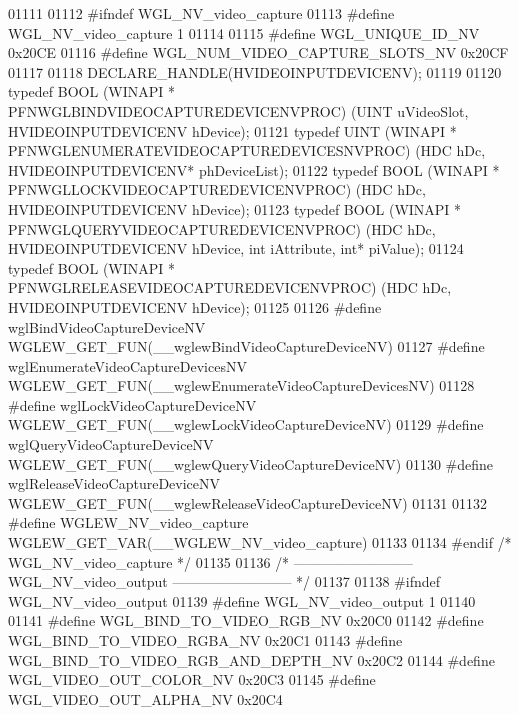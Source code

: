 \begin{DoxyCode}
01111 
01112 \textcolor{preprocessor}{#ifndef WGL\_NV\_video\_capture}
01113 \textcolor{preprocessor}{#define WGL\_NV\_video\_capture 1}
01114 
01115 \textcolor{preprocessor}{#define WGL\_UNIQUE\_ID\_NV 0x20CE}
01116 \textcolor{preprocessor}{#define WGL\_NUM\_VIDEO\_CAPTURE\_SLOTS\_NV 0x20CF}
01117 
01118 DECLARE_HANDLE(HVIDEOINPUTDEVICENV);
01119 
01120 \textcolor{keyword}{typedef} BOOL (WINAPI * PFNWGLBINDVIDEOCAPTUREDEVICENVPROC) (UINT uVideoSlot, HVIDEOINPUTDEVICENV 
      hDevice);
01121 \textcolor{keyword}{typedef} UINT (WINAPI * PFNWGLENUMERATEVIDEOCAPTUREDEVICESNVPROC) (HDC hDc, HVIDEOINPUTDEVICENV* 
      phDeviceList);
01122 \textcolor{keyword}{typedef} BOOL (WINAPI * PFNWGLLOCKVIDEOCAPTUREDEVICENVPROC) (HDC hDc, HVIDEOINPUTDEVICENV 
      hDevice);
01123 \textcolor{keyword}{typedef} BOOL (WINAPI * PFNWGLQUERYVIDEOCAPTUREDEVICENVPROC) (HDC hDc, HVIDEOINPUTDEVICENV 
      hDevice, \textcolor{keywordtype}{int} iAttribute, \textcolor{keywordtype}{int}* piValue);
01124 \textcolor{keyword}{typedef} BOOL (WINAPI * PFNWGLRELEASEVIDEOCAPTUREDEVICENVPROC) (HDC hDc, HVIDEOINPUTDEVICENV 
      hDevice);
01125 
01126 \textcolor{preprocessor}{#define wglBindVideoCaptureDeviceNV WGLEW\_GET\_FUN(\_\_wglewBindVideoCaptureDeviceNV)}
01127 \textcolor{preprocessor}{#define wglEnumerateVideoCaptureDevicesNV WGLEW\_GET\_FUN(\_\_wglewEnumerateVideoCaptureDevicesNV)}
01128 \textcolor{preprocessor}{#define wglLockVideoCaptureDeviceNV WGLEW\_GET\_FUN(\_\_wglewLockVideoCaptureDeviceNV)}
01129 \textcolor{preprocessor}{#define wglQueryVideoCaptureDeviceNV WGLEW\_GET\_FUN(\_\_wglewQueryVideoCaptureDeviceNV)}
01130 \textcolor{preprocessor}{#define wglReleaseVideoCaptureDeviceNV WGLEW\_GET\_FUN(\_\_wglewReleaseVideoCaptureDeviceNV)}
01131 
01132 \textcolor{preprocessor}{#define WGLEW\_NV\_video\_capture WGLEW\_GET\_VAR(\_\_WGLEW\_NV\_video\_capture)}
01133 
01134 \textcolor{preprocessor}{#endif }\textcolor{comment}{/* WGL\_NV\_video\_capture */}\textcolor{preprocessor}{}
01135 
01136 \textcolor{comment}{/* -------------------------- WGL\_NV\_video\_output -------------------------- */}
01137 
01138 \textcolor{preprocessor}{#ifndef WGL\_NV\_video\_output}
01139 \textcolor{preprocessor}{#define WGL\_NV\_video\_output 1}
01140 
01141 \textcolor{preprocessor}{#define WGL\_BIND\_TO\_VIDEO\_RGB\_NV 0x20C0}
01142 \textcolor{preprocessor}{#define WGL\_BIND\_TO\_VIDEO\_RGBA\_NV 0x20C1}
01143 \textcolor{preprocessor}{#define WGL\_BIND\_TO\_VIDEO\_RGB\_AND\_DEPTH\_NV 0x20C2}
01144 \textcolor{preprocessor}{#define WGL\_VIDEO\_OUT\_COLOR\_NV 0x20C3}
01145 \textcolor{preprocessor}{#define WGL\_VIDEO\_OUT\_ALPHA\_NV 0x20C4}

\end{DoxyCode}
